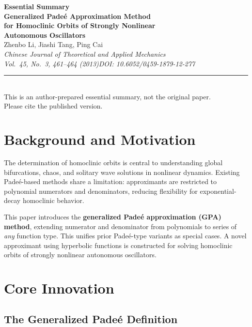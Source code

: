 \documentclass[11pt,a4paper]{article}
\begin{document}
\begin{center}
{\LARGE\bfseries\color{primary}Essential Summary}\\[12pt]
{\large\bfseries Generalized Pade\'{e} Approximation Method\\for Homoclinic Orbits of Strongly Nonlinear\\Autonomous Oscillators}\\[8pt]
{\normalsize Zhenbo Li, Jiashi Tang, Ping Cai}\\[4pt]
{\small\itshape Chinese Journal of Theoretical and Applied Mechanics\\Vol.\ 45, No.\ 3, 461--464 (2013)\quad DOI: 10.6052/0459-1879-12-277}\\[6pt]
{\small\rule{0.7\textwidth}{0.5pt}}\\[4pt]
{\small\color{accent}This is an author-prepared essential summary, not the original paper.\\Please cite the published version.}
\end{center}

\vspace{0.5em}

\section{Background and Motivation}

The determination of homoclinic orbits is central to understanding global bifurcations, chaos, and solitary wave solutions in nonlinear dynamics. Existing Pade\'{e}-based methods share a limitation: approximants are restricted to polynomial numerators and denominators, reducing flexibility for exponential-decay homoclinic behavior.

This paper introduces the \textbf{generalized Pade\'{e} approximation (GPA) method}, extending numerator and denominator from polynomials to series of \emph{any} function type. This unifies prior Pade\'{e}-type variants as special cases. A novel approximant using hyperbolic functions is constructed for solving homoclinic orbits of strongly nonlinear autonomous oscillators.

\section{Core Innovation}

\subsection{The Generalized Pade\'{e} Definition}
\end{document}
